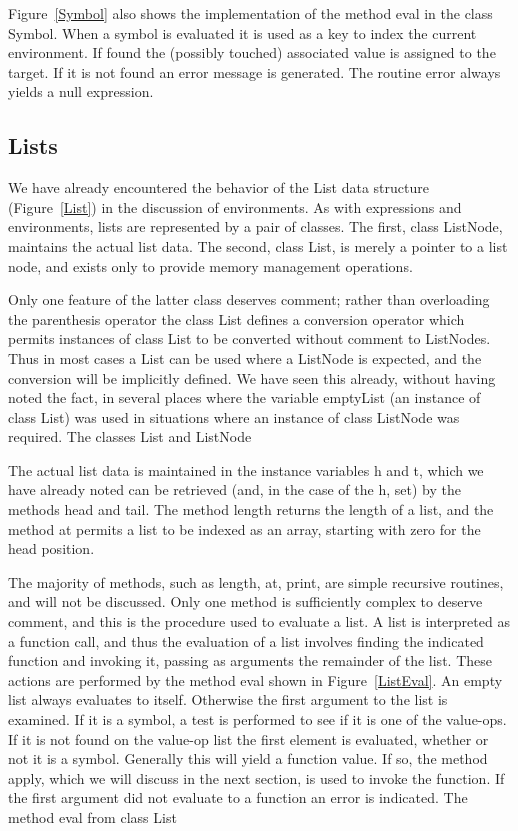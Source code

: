 Figure~\ref{Symbol} also shows the implementation of the method {\sf eval} in
the class {\sf Symbol}.  When a symbol is evaluated it is used as a key to index
the current environment.  If found the (possibly touched) associated value is
assigned to the target.  If it is not found an error message is generated.  The
routine {\sf error} always yields a null expression.

\subsection{Lists}
\label{listsec}

We have already encountered the behavior of the List data structure
(Figure~\ref{List}) in the discussion of environments.  As with expressions and
environments, lists are represented by a pair of classes.  The first, class {\sf
    ListNode}, maintains the actual list data.  The second, class {\sf List}, is
merely a pointer to a list node, and exists only to provide memory management
operations.

Only one feature of the latter class deserves comment; rather than overloading
the parenthesis operator the class {\sf List} defines a conversion operator
which permits instances of class {\sf List} to be converted without comment to
{\sf ListNodes}.  Thus in most cases a {\sf List} can be used where a {\sf
    ListNode} is expected, and the conversion will be implicitly defined.  We
have seen this already, without having noted the fact, in several places where
the variable {\sf emptyList} (an instance of class {\sf List}) was used in
situations where an instance of class {\sf ListNode} was required.
%
{The classes {\sf List} and {\sf ListNode}}

The actual list data is maintained in the instance variables {\sf h} and {\sf
    t}, which we have already noted can be retrieved (and, in the case of the h,
set) by the methods {\sf head} and {\sf tail}.  The method {\sf length} returns
the length of a list, and the method {\sf at} permits a list to be indexed as an
array, starting with zero for the head position.

The majority of methods, such as {\sf length}, {\sf at}, {\sf print}, are simple
recursive routines, and will not be discussed.  Only one method is sufficiently
complex to deserve comment, and this is the procedure used to evaluate a list.
A list is interpreted as a function call, and thus the evaluation of a list
involves finding the indicated function and invoking it, passing as arguments
the remainder of the list.  These actions are performed by the method {\sf eval}
shown in Figure~\ref{ListEval}.  An empty list always evaluates to itself.
Otherwise the first argument to the list is examined.  If it is a symbol, a test
is performed to see if it is one of the value-ops.  If it is not found on the
value-op list the first element is evaluated, whether or not it is a symbol.
Generally this will yield a function value.  If so, the method {\sf apply},
which we will discuss in the next section, is used to invoke the function.  If
the first argument did not evaluate to a function an error is indicated.
%
{The method {\sf eval} from class {\sf List}}

